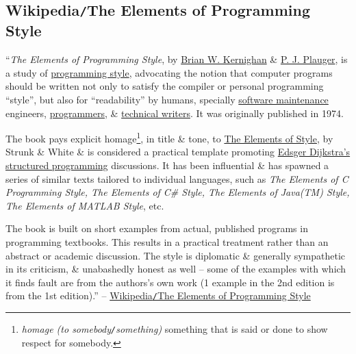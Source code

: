 \documentclass{article}
\begin{document}
\subsection{Wikipedia{\tt/}The Elements of Programming Style}
``{\it The Elements of Programming Style}, by \href{https://en.wikipedia.org/wiki/Brian_W._Kernighan}{Brian W. Kernighan} \& \href{https://en.wikipedia.org/wiki/P._J._Plauger}{P. J. Plauger}, is a study of \href{https://en.wikipedia.org/wiki/Programming_style}{programming style}, advocating the notion that computer programs should be written not only to satisfy the compiler or personal programming ``style'', but also for ``readability'' by humans, specially \href{https://en.wikipedia.org/wiki/Software_maintenance}{software maintenance} engineers, \href{https://en.wikipedia.org/wiki/Programmers}{programmers}, \& \href{https://en.wikipedia.org/wiki/Technical_writers}{technical writers}. It was originally published in 1974.

The book pays explicit homage\footnote{{\it homage (to somebody{\tt/}something)} something that is said or done to show respect for somebody.}, in title \& tone, to \href{https://en.wikipedia.org/wiki/The_Elements_of_Style}{The Elements of Style}, by Strunk \& White \& is considered a practical template promoting \href{https://en.wikipedia.org/wiki/Edsger_Dijkstra}{Edsger Dijkstra's structured programming} discussions. It has been influential \& has spawned a series of similar texts tailored to individual languages, such as {\it The Elements of C Programming Style, The Elements of C\# Style, The Elements of Java(TM) Style, The Elements of MATLAB Style}, etc.

The book is built on short examples from actual, published programs in programming textbooks. This results in a practical treatment rather than an abstract or academic discussion. The style is diplomatic \& generally sympathetic in its criticism, \& unabashedly honest as well -- some of the examples with which it finds fault are from the authors's own work (1 example in the 2nd edition is from the 1st edition).'' -- \href{https://en.wikipedia.org/wiki/The_Elements_of_Programming_Style}{Wikipedia{\tt/}The Elements of Programming Style}
\end{document}
